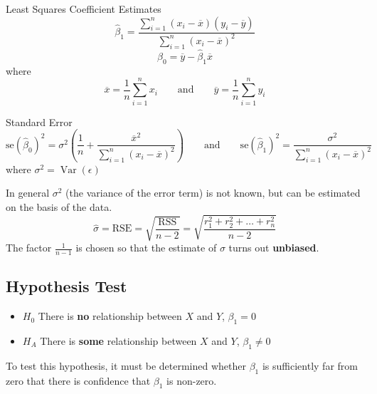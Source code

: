 \documentclass[11pt]{article}
\theoremstyle{definition}
\newcommand*\samplemean[1]{\overline{#1}}
\newcommand*\Var[1]{\mathop{\text{Var}}\left(#1\right)}
\begin{document}
\begin{definition}
	Least Squares Coefficient Estimates
	\begin{equation*}
		\hat{\beta}_1 = \frac{\sum_{i=1}^{n}(x_i - \samplemean{x})(y_i - \samplemean{y})}{\sum_{i=1}^{n}(x_i - \samplemean{x})^2}
	\end{equation*}
	\begin{equation*}
		\hat{\beta}_0 = \samplemean{y} - \hat{\beta}_1 \samplemean{x}
	\end{equation*}
	where
	\begin{equation*}
		\samplemean{x} = \frac{1}{n}\sum_{i=1}^{n} x_i\qquad\text{and}\qquad\samplemean{y} = \frac{1}{n}\sum_{i=1}^{n} y_i	
	\end{equation*}
\end{definition}

\begin{definition}
	Standard Error
	\begin{equation*}
		\text{se}(\hat{\beta}_0)^2 = \sigma^2 \left( \frac{1}{n} + \frac{\samplemean{x}^2}{\sum_{i=1}^{n}(x_i - \samplemean{x})^2} \right) \qquad\text{and}\qquad \text{se}(\hat{\beta}_1)^2 = \frac{\sigma^2}{\sum_{i=1}^{n}(x_i-\samplemean{x})^2}
	\end{equation*}
	where $\sigma^2 = \Var{\epsilon}$
\end{definition}
In general $\sigma^2$ (the variance of the error term) is not known, but can be estimated on the basis of the data.
\begin{equation*}
	\hat{\sigma} = \text{RSE} = \sqrt{\frac{\text{RSS}}{n-2}} = \sqrt{\frac{r_1^2 + r_2^2 + \dots + r_n^2}{n-2}}
\end{equation*}
The factor $\frac{1}{n-1}$ is chosen so that the estimate of $\sigma$ turns out \textbf{unbiased}.

\subsection{Hypothesis Test}
\begin{itemize}[noitemsep]
	\item $H_0$ There is \textbf{no} relationship between $X$ and $Y$, \quad $\beta_1 = 0$
	\item $H_A$ There is \textbf{some} relationship between $X$ and $Y$, \quad $\beta_1 \neq 0$
\end{itemize}
To test this hypothesis, it must be determined whether $\beta_1$ is sufficiently far from zero that there is confidence that $\beta_1$ is non-zero.
\end{document}
